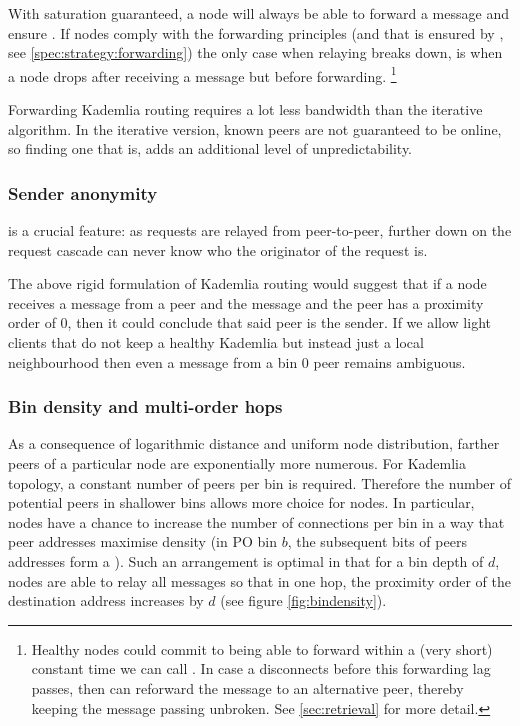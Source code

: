 With  saturation guaranteed, a node will always be able to forward a message and ensure . If nodes comply with the forwarding principles (and that is ensured by , see \ref{spec:strategy:forwarding}) the only case when relaying breaks down, is when a node drops after receiving a message but before forwarding.%
%
\footnote{Healthy nodes could commit to being able to forward within a (very short) constant time we can call . In case a  disconnects before this forwarding lag passes, then  can reforward the message to an alternative peer, thereby keeping the message passing unbroken. See \ref{sec:retrieval} for more detail.
} 

Forwarding Kademlia routing requires a lot less bandwidth than the iterative algorithm. In the iterative version, known peers are not guaranteed to be online, so finding one that is, adds an additional level of unpredictability.

\subsubsection{Sender anonymity}
 is a crucial feature: as requests are relayed from peer-to-peer, further down on the request cascade can never know who the originator of the request is. 

The above rigid formulation of Kademlia routing would suggest that if a node receives a message from a peer and the message and the peer has a proximity order of 0, then it could conclude that said peer is the sender. If we allow light clients that do not keep a healthy Kademlia but instead just a local neighbourhood then even a message from a bin 0 peer remains ambiguous. 

\subsubsection{Bin density and multi-order hops} \label{sec:bindensity}

As a consequence of logarithmic distance and uniform node distribution, farther peers of a particular node are exponentially more numerous. For Kademlia topology, a constant number of peers per bin is required. Therefore the number of potential peers in shallower bins allows more choice for nodes. In particular, nodes have a chance to increase the number of connections per bin in a way that peer addresses maximise density (in PO bin $b$, the subsequent bits of peers addresses form a ). Such an arrangement is optimal in that for a bin depth of $d$, nodes are able to relay all messages so that in one hop, the proximity order of the destination address increases by $d$ (see figure \ref{fig:bindensity}). 


